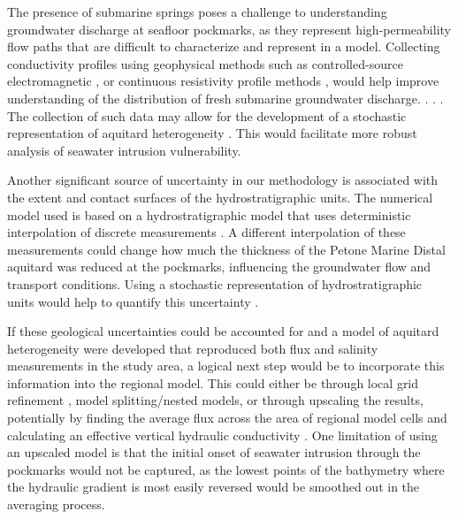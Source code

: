 \documentclass[draft, 10pt]{agujournal2019}
\begin{document}
The presence of submarine springs poses a challenge to understanding groundwater discharge at seafloor pockmarks, as they represent high-permeability flow paths that are difficult to characterize and represent in a model. 
Collecting conductivity profiles using geophysical methods such as controlled-source electromagnetic \cite{gustafson_aquifer_2019, micallef_3d_2020}, or continuous resistivity profile methods \cite{becker_locating_2023}, would help improve understanding of the distribution of fresh submarine groundwater discharge. 
\cite{hoffmann_fresh_2023}. 
 \cite{reusch_giant_2015}.  \cite{poulsen_detecting_2015}.
The collection of such data may allow for the development of a stochastic representation of aquitard heterogeneity \cite{van_leer_investigating_2025}. This would facilitate more robust analysis of seawater intrusion vulnerability.

Another significant source of uncertainty in our methodology is associated with the extent and contact surfaces of the hydrostratigraphic units. The numerical model used is based on a hydrostratigraphic model that uses deterministic interpolation of discrete measurements \cite{begg_revised_2023}. A different interpolation of these measurements could change how much the thickness of the Petone Marine Distal aquitard was reduced at the pockmarks, influencing the groundwater flow and transport conditions. Using a stochastic representation of hydrostratigraphic units would help to quantify this uncertainty \cite{de_la_varga_gempy_2019, haehnel_development_2024, bardot_seamless_2025}. 

If these geological uncertainties could be accounted for and a model of aquitard heterogeneity were developed that reproduced both flux and salinity measurements in the study area, a logical next step would be to incorporate this information into the regional model. This could either be through local grid refinement \cite{hughes_flopy_2024}, model splitting/nested models, or through upscaling the results, potentially by finding the average flux across the area of regional model cells and calculating an effective vertical hydraulic conductivity \cite{van_leer_estimating_2023}. One limitation of using an upscaled model is that the initial onset of seawater intrusion through the pockmarks would not be captured, as the lowest points of the bathymetry where the hydraulic gradient is most easily reversed would be smoothed out in the averaging process.
\end{document}
